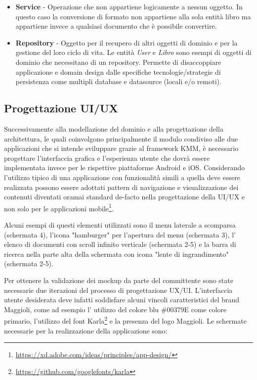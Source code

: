 \begin{itemize}
    \item \textbf{Service} - Operazione che non appartiene logicamente a nessun oggetto. In questo caso la conversione di formato non appartiene alla sola entità libro ma appartiene invece a qualsiasi documento che è possibile convertire.
    \item \textbf{Repository} - Oggetto per il recupero di altri oggetti di dominio e per la gestione del loro ciclo di vita. Le entità \textit{User} e \textit{Libro} sono esempi di oggetti di dominio che necessitano di un repository. Permette di disaccoppiare applicazione e domain design dalle specifiche tecnologie/strategie di persistenza come multipli database e datasource (locali e/o remoti).
\end{itemize}

\subsection{Progettazione UI/UX}
Successivamente alla modellazione del dominio e alla progettazione della architettura, le quali coinvolgono principalmente il modulo condiviso alle due applicazioni che si intende sviluppare grazie al framework KMM, è necessario progettare l'interfaccia grafica e l'esperienza utente che dovrà essere implementata invece per le rispettive piattaforme Android e iOS. Considerando l'utilizzo tipico di una applicazione con funzionalità simili a quella deve essere realizzata possono essere adottati pattern di navigazione e visualizzazione dei contenuti diventati oramai standard de-facto nella progettazione della UI/UX e non solo per le applicazioni mobile\footnote{\href{https://xd.adobe.com/ideas/principles/app-design/}{https://xd.adobe.com/ideas/principles/app-design/}}.

Alcuni esempi di questi elementi utilizzati sono il menu laterale a scomparsa (schermata 4), l'icona "hamburger" per l'apertura del menu (schermata 3), l' elenco di documenti con scroll infinito verticale (schermata 2-5) e la barra di ricerca nella parte alta della schermata con icona "lente di ingrandimento" (schermata 2-5). 

Per ottenere la validazione dei mockup da parte del committente sono state necessarie due iterazioni del processo di progettazione UX/UI. L'interfaccia utente desiderata deve infatti soddisfare alcuni vincoli caratteristici del brand Maggioli, come ad esempio l' utilizzo del colore blu \#00379E come colore primario, l'utilizzo del font Karla\footnote{\href{https://github.com/googlefonts/karla}{https://github.com/googlefonts/karla}} e la presenza del logo Maggioli. Le schermate necessarie per la realizzazione della applicazione sono:

